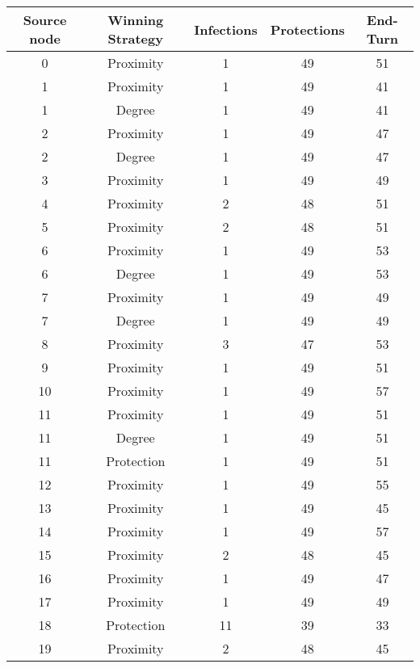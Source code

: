 \documentclass[results.tex]{subfiles}
\begin{document}
\begin{center}
  \begin{tabular}{| c || c | c | c | c |}
    \hline
    {\bfseries Source node} & {\bfseries Winning Strategy} & {\bfseries Infections} & {\bfseries Protections} & {\bfseries End-Turn} \\  %
    \hline\hline
    0 & Proximity & 1 & 49 & 51 \\ 
    \hline
    1 & Proximity & 1 & 49 & 41 \\ 
    \hline
    1 & Degree & 1 & 49 & 41 \\ 
    \hline
    2 & Proximity & 1 & 49 & 47 \\ 
    \hline
    2 & Degree & 1 & 49 & 47 \\ 
    \hline
    3 & Proximity & 1 & 49 & 49 \\ 
    \hline
    4 & Proximity & 2 & 48 & 51 \\ 
    \hline
    5 & Proximity & 2 & 48 & 51 \\ 
    \hline
    6 & Proximity & 1 & 49 & 53 \\ 
    \hline
    6 & Degree & 1 & 49 & 53 \\ 
    \hline
    7 & Proximity & 1 & 49 & 49 \\ 
    \hline
    7 & Degree & 1 & 49 & 49 \\ 
    \hline
    8 & Proximity & 3 & 47 & 53 \\ 
    \hline
    9 & Proximity & 1 & 49 & 51 \\ 
    \hline
    10 & Proximity & 1 & 49 & 57 \\ 
    \hline
    11 & Proximity & 1 & 49 & 51 \\ 
    \hline
    11 & Degree & 1 & 49 & 51 \\ 
    \hline
    11 & Protection & 1 & 49 & 51 \\ 
    \hline
    12 & Proximity & 1 & 49 & 55 \\ 
    \hline
    13 & Proximity & 1 & 49 & 45 \\ 
    \hline
    14 & Proximity & 1 & 49 & 57 \\ 
    \hline
    15 & Proximity & 2 & 48 & 45 \\ 
    \hline
    16 & Proximity & 1 & 49 & 47 \\ 
    \hline
    17 & Proximity & 1 & 49 & 49 \\ 
    \hline
    18 & Protection & 11 & 39 & 33 \\ 
    \hline
    19 & Proximity & 2 & 48 & 45 \\ 

\end{tabular}
\end{center}
\end{document}
